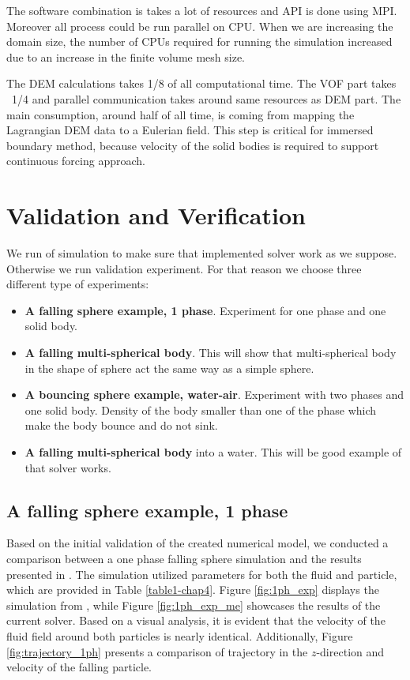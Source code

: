 The software combination is takes a lot of resources and API is done using MPI. Moreover all process could be run parallel on CPU. When we are increasing the domain size, the number of CPUs required for running the simulation increased due to an increase in the finite volume mesh size.

The DEM calculations takes 1/8 of all computational time. The VOF part takes ~1/4 and parallel communication takes around same resources as DEM part. The main consumption, around half of all time, is coming from mapping the Lagrangian DEM data to a Eulerian field.  This step is critical for immersed boundary method, because velocity of the solid bodies is required to support continuous forcing approach.


\section{Validation and Verification}
We run of simulation to make sure that implemented solver work as we suppose. Otherwise we run validation experiment. For that reason we choose three different type of experiments:
\begin{itemize}
    \item \textbf{A falling sphere example, 1 phase}. Experiment for one phase and one solid body. 
    \item \textbf{A falling multi-spherical body}. This will show that multi-spherical body in the shape of sphere act the same way as a simple sphere.
    \item \textbf{A bouncing sphere example, water-air}. Experiment with two phases and one solid body. Density of the body smaller than one of the phase which make the body bounce and do not sink.
    \item \textbf{A falling multi-spherical body} into a water. This will be good example of that solver works.
\end{itemize}

\subsection{A falling sphere example, 1 phase}
Based on the initial validation of the created numerical model, we conducted a comparison between a one phase falling sphere simulation and the results presented in \cite{nan2023high}. The simulation utilized parameters for both the fluid and particle, which are provided in Table \ref{table1-chap4}. Figure \ref{fig:1ph_exp} displays the simulation from \cite{nan2023high}, while Figure \ref{fig:1ph_exp_me} showcases the results of the current solver. Based on a visual analysis, it is evident that the velocity of the fluid field around both particles is nearly identical. Additionally, Figure \ref{fig:trajectory_1ph} presents a comparison of trajectory in the $z$-direction and velocity of the falling particle.

